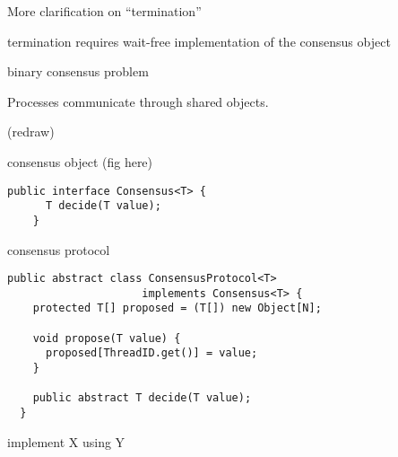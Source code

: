 \begin{frame}{}
  More clarification on ``termination''

  termination requires wait-free implementation of the consensus object

  binary consensus problem
\end{frame}

\begin{frame}{}
  \centerline{Processes communicate through shared objects.}

  (redraw)
\end{frame}

\begin{frame}[fragile]{}
  consensus object (fig here)

  \begin{lstlisting}[style = JavaStyle]
    public interface Consensus<T> {
      T decide(T value);
    }
  \end{lstlisting}
\end{frame}

\begin{frame}[fragile]{}
  consensus protocol

  \begin{lstlisting}[style = JavaStyle]
  public abstract class ConsensusProtocol<T> 
                     implements Consensus<T> {
    protected T[] proposed = (T[]) new Object[N];
  
    void propose(T value) {
      proposed[ThreadID.get()] = value;
    }
  
    public abstract T decide(T value);
  }
  \end{lstlisting}
\end{frame}

\begin{frame}{}
  implement X using Y
\end{frame}
